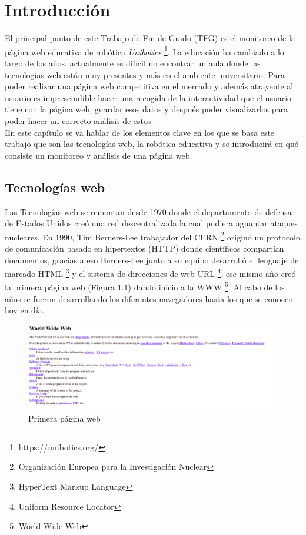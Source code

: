 \chapter{Introducción}
\label{chap:introduccion} 
El principal punto de este Trabajo de Fin de Grado (TFG) es el monitoreo de la página web educativa de robótica \textit{Unibotics} \footnote{https://unibotics.org/}. La educación ha cambiado a lo largo de los años, actualmente es difícil no encontrar un aula donde las tecnologías web están muy presentes y más en el ambiente universitario. Para poder realizar una página web competitiva en el mercado y además atrayente al usuario es imprescindible hacer una recogida de la interactividad que el usuario tiene con la página web, guardar esos datos y después poder visualizarlos para poder hacer un correcto análisis de estos. \\

En este capítulo se va hablar de los elementos clave en los que se basa este trabajo que son las tecnologías web, la robótica educativa y se introducirá en qué consiste un monitoreo y análisis de una página web.



\section{Tecnologías web}\label{motivacion}
Las Tecnologías web se remontan desde 1970 donde el departamento de defensa de Estados Unidos creó una red descentralizada la cual pudiera aguantar ataques nucleares. En 1990, Tim Berners-Lee trabajador del CERN \footnote{Organización Europea para​ la Investigación Nuclear} originó un protocolo de comunicación basado en hipertextos (HTTP) donde científicos compartían documentos, gracias a eso Berners-Lee junto a su equipo desarrolló el lenguaje de marcado HTML \footnote{HyperText Markup Language} y el sistema de direcciones de web URL \footnote{Uniform Resource Locator}, ese mismo año creó la primera página web (Figura 1.1) dando inicio a la WWW \footnote{World Wide Web}. Al cabo de los años se fueron desarrollando los diferentes navegadores hasta los que se conocen hoy en día. \\

\begin{figure}[H]
    \centering
    \includegraphics[width=20cm, keepaspectratio]{img/first_web_page.png}
    \caption{Primera página web}
    \label{fig:web}
\end{figure}

